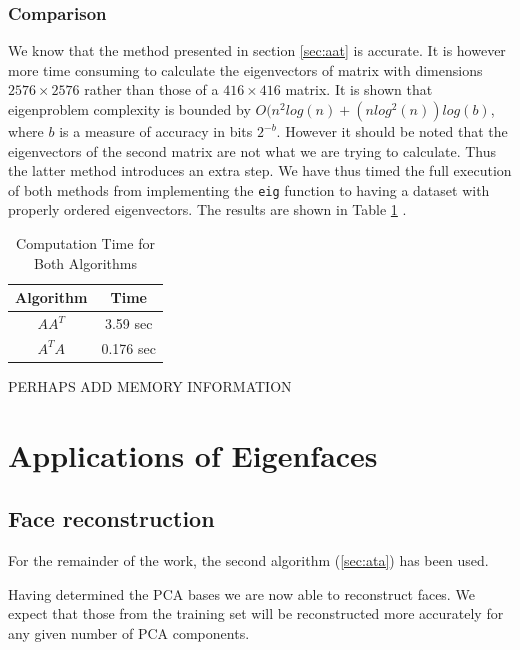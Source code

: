 \documentclass[10pt,twocolumn,letterpaper]{article}
\begin{document}
\subsubsection{Comparison}

We know that the method presented in section \ref{sec:aat} is accurate. It is however more time consuming to calculate the eigenvectors of matrix with dimensions $2576 \times 2576$ rather than those of a $416 \times 416$ matrix. It is shown \cite{Complex} that eigenproblem complexity is bounded by $O(n^2log(n)+(nlog^2(n))log(b)$, where $b$ is a measure of accuracy in bits $2^{-b}$. However it should be noted that the eigenvectors of the second matrix are not what we are trying to calculate. Thus the latter method introduces an extra step. We have thus timed the full execution of both methods from implementing the {\tt\small eig} function to having a dataset with properly ordered eigenvectors. The results are shown in Table \ref{tab:times1} .

\begin{table}[H]
\begin{center}
\begin{tabular}{||c c||}
\hline
\bf Algorithm & \bf Time\\ [0.5ex]
\hline
 $AA^T$ & 3.59 sec\\ [0.5ex]
\hline
 $A^TA$ & 0.176 sec \\ [0.5ex]
\hline
\end{tabular}
\end{center}
\caption{Computation Time for Both Algorithms} \label{tab:times1}
\end{table}

PERHAPS ADD MEMORY INFORMATION

\section{Applications of Eigenfaces}
\subsection{Face reconstruction}

For the remainder of the work, the second algorithm (\ref{sec:ata}) has been used.

Having determined the PCA bases we are now able to reconstruct faces. We expect that those from the training set will be reconstructed more accurately for any given number of PCA components.
\end{document}
